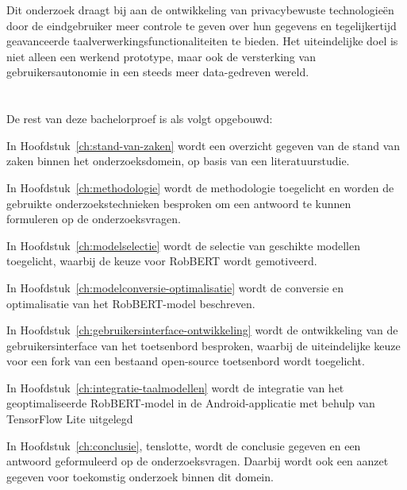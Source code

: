 Dit onderzoek draagt bij aan de ontwikkeling van privacybewuste technologieën door de eindgebruiker meer controle te geven over hun gegevens en tegelijkertijd geavanceerde taalverwerkingsfunctionaliteiten te bieden. Het uiteindelijke doel is niet alleen een werkend prototype, maar ook de versterking van gebruikersautonomie in een steeds meer data-gedreven wereld.

\section{}%
\label{sec:opzet-bachelorproef}


De rest van deze bachelorproef is als volgt opgebouwd:

In Hoofdstuk~\ref{ch:stand-van-zaken} wordt een overzicht gegeven van de stand van zaken binnen het onderzoeksdomein, op basis van een literatuurstudie.

In Hoofdstuk~\ref{ch:methodologie} wordt de methodologie toegelicht en worden de gebruikte onderzoekstechnieken besproken om een antwoord te kunnen formuleren op de onderzoeksvragen.

In Hoofdstuk~\ref{ch:modelselectie} wordt de selectie van geschikte modellen toegelicht, waarbij de keuze voor RobBERT wordt gemotiveerd.

In Hoofdstuk~\ref{ch:modelconversie-optimalisatie} wordt de conversie en optimalisatie van het RobBERT-model beschreven.

In Hoofdstuk~\ref{ch:gebruikersinterface-ontwikkeling} wordt de ontwikkeling van de gebruikersinterface van het toetsenbord besproken, waarbij de uiteindelijke keuze voor een fork van een bestaand open-source toetsenbord wordt toegelicht.

In Hoofdstuk~\ref{ch:integratie-taalmodellen} wordt de integratie van het geoptimaliseerde RobBERT-model in de Android-applicatie met behulp van TensorFlow Lite uitgelegd

In Hoofdstuk~\ref{ch:conclusie}, tenslotte, wordt de conclusie gegeven en een antwoord geformuleerd op de onderzoeksvragen. Daarbij wordt ook een aanzet gegeven voor toekomstig onderzoek binnen dit domein.